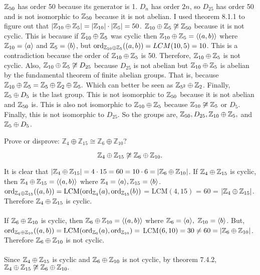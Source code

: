 \documentclass[titlepage]{article}
\begin{document}
\begin{solution}
$\mathbb{Z}_{50}$ has order 50 because its generator is 1. $D_n$ has order $2n$, so $D_{25}$ has order 50 and is not isomorphic to $\mathbb{Z}_{50}$ because it is not abelian. I used theorem 8.1.1 to figure out that $|\mathbb{Z}_{10}\oplus \mathbb{Z}_{5}| = |\mathbb{Z}_{10}|\cdot |\mathbb{Z}_{5}| = 50$. $\mathbb{Z}_{10} \oplus \mathbb{Z}_{5} \not \cong \mathbb{Z}_{50}$ because it is not cyclic. This is because if $\mathbb{Z}_{10} \oplus \mathbb{Z}_5$ was cyclic then  $\mathbb{Z}_{10} \oplus \mathbb{Z}_5 = \langle (a,b)\rangle$ where $\mathbb{Z}_{10} = \langle a \rangle$ and $\mathbb{Z}_5 = \langle b \rangle$, but $\text{ord}_{\mathbb{Z}_{10}\oplus\mathbb{Z}_5}((a,b)) = LCM(10,5) = 10$. This is a contradiction because the order of $\mathbb{Z}_{10} \oplus \mathbb{Z}_5$ is 50. Therefore, $\mathbb{Z}_{10} \oplus \mathbb{Z}_5$ is not cyclic. Also, $\mathbb{Z}_{10} \oplus \mathbb{Z}_{5} \not \cong D_{25}$ because $D_{25}$ is not abelian but $\mathbb{Z}_{10} \oplus \mathbb{Z}_5$ is abelian by the fundamental theorem of finite abelian groups. That is, because $\mathbb{Z}_{10} \oplus \mathbb{Z}_5= \mathbb{Z}_5 \oplus \mathbb{Z}_2 \oplus \mathbb{Z}_5.$ Which can better be seen as $\mathbb{Z}_{5^2} \oplus \mathbb{Z}_{2}$. Finally, $\mathbb{Z}_{5} \oplus D_5$ is the last group. This is not isomorphic to $\mathbb{Z}_{50}$ because it is not abelian and $\mathbb{Z}_{50}$ is. This is also not isomorphic to $\mathbb{Z}_{10} \oplus \mathbb{Z}_5$ because $\mathbb{Z}_{10} \not \cong \mathbb{Z}_5$ or $D_5$. Finally, this is not isomorphic to $D_{25}$. So the groups are, $\mathbb{Z}_{50}, D_{25}, \mathbb{Z}_{10} \oplus \mathbb{Z}_5,$ and $\mathbb{Z}_5 \oplus D_{5}$.
\end{solution}

\begin{problem}{8}
Prove or disprove: $\mathbb{Z}_4 \oplus \mathbb{Z}_{15} \cong \mathbb{Z}_6 \oplus \mathbb{Z}_{10}$?
\end{problem}
$$\mathbb{Z}_4 \oplus \mathbb{Z}_{15} \not \cong \mathbb{Z}_6 \oplus \mathbb{Z}_{10}.$$
\begin{myproof}
It is clear that $|\mathbb{Z}_4 \oplus \mathbb{Z}_{15}| = 4\cdot15 = 60 = 10\cdot6 = |\mathbb{Z}_6 \oplus \mathbb{Z}_{10}|$. If $\mathbb{Z}_4 \oplus \mathbb{Z}_{15}$ is cyclic, then $\mathbb{Z}_4 \oplus \mathbb{Z}_{15} = \langle (a,b) \rangle$ where $\mathbb{Z}_4 = \langle a \rangle, \mathbb{Z}_{15} = \langle b \rangle$. $\text{ord}_{\mathbb{Z}_4\oplus\mathbb{Z}_{15}}((a,b)) = \text{LCM}(\text{ord}_{\mathbb{Z}_4}(a), \text{ord}_{\mathbb{Z}_{15}}(b))$ = LCM$(4,15)$ = 60 = $|\mathbb{Z}_4 \oplus \mathbb{Z}_{15}|$. Therefore $\mathbb{Z}_4 \oplus \mathbb{Z}_{15}$ is cyclic.
\\ \\
If $\mathbb{Z}_6 \oplus \mathbb{Z}_{10}$ is cyclic, then $\mathbb{Z}_6 \oplus \mathbb{Z}_{10} = \langle (a,b) \rangle$ where $\mathbb{Z}_6 = \langle a \rangle, \ \mathbb{Z}_{10} = \langle b \rangle$. But, $\text{ord}_{\mathbb{Z}_6 \oplus \mathbb{Z}_{10}}((a,b)) = \text{LCM}(\text{ord}_{\mathbb{Z}_6}(a), \text{ord}_{\mathbb{Z}_{10}}) = $ LCM$(6,10) = 30 \neq 60 = |\mathbb{Z}_6 \oplus \mathbb{Z}_{10}|$. Therefore $\mathbb{Z}_6 \oplus \mathbb{Z}_{10}$ is not cyclic.
\\ \\
Since $\mathbb{Z}_4 \oplus \mathbb{Z}_{15}$ is cyclic and $\mathbb{Z}_6 \oplus \mathbb{Z}_{10}$ is not cyclic, by theorem 7.4.2,  $\mathbb{Z}_4 \oplus \mathbb{Z}_{15} \not \cong \mathbb{Z}_6 \oplus \mathbb{Z}_{10}.$
\end{myproof} 
\end{document}
